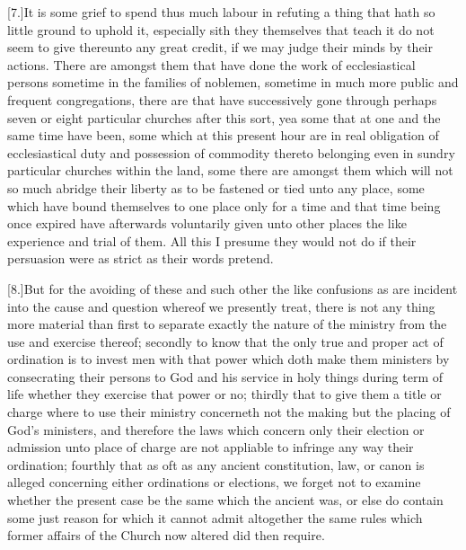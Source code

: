 [7.]It is some grief to spend thus much labour in refuting a thing that hath so little ground to uphold it, especially sith they themselves that teach it do not seem to give thereunto any great credit, if we may judge their minds by their actions. There are amongst them that have done the work of ecclesiastical persons sometime in the families of noblemen, sometime in much more public and frequent congregations, there are that have successively gone through perhaps seven or eight particular churches after this sort, yea some that at one and the same time have been, some which at this present hour are in real obligation of ecclesiastical duty and possession of commodity thereto belonging even in sundry particular churches within the land, some there are amongst them which will not so much abridge their liberty as to be fastened or tied unto any place, some which have bound themselves to one place only for a time and that time being once expired have afterwards voluntarily given unto other places the like experience and trial of them. All this  I presume they would not do if their persuasion were as strict as their words pretend.

[8.]But for the avoiding of these and such other the like confusions as are incident into the cause and question whereof we presently treat, there is not any thing more material than first to separate exactly the nature of the ministry from the use and exercise thereof; secondly to know that the only true and proper act of ordination is to invest men with that power which doth make them ministers by consecrating their persons to God and his service in holy things during term of life whether they exercise that power or no; thirdly that to give them a title or charge where to use their ministry concerneth not the making but the placing of God’s ministers, and therefore the laws which concern only their election or admission unto place of charge are not appliable to infringe any way their ordination; fourthly that as oft as any ancient constitution, law, or canon is alleged concerning either ordinations or elections, we forget not to examine whether the present case be the same which the ancient was, or else do contain some just reason for which it cannot admit altogether the same rules which former affairs of the Church now altered did then require.

